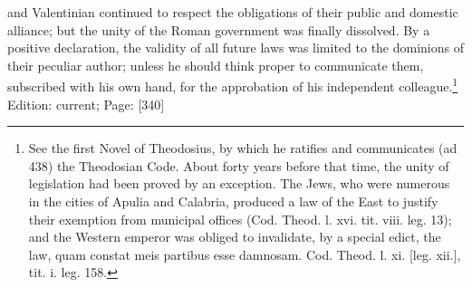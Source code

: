 and Valentinian continued to respect the obligations of their public and domestic alliance; but the unity of the Roman government was finally dissolved. By a positive declaration, the validity of all future laws was limited to the dominions of their peculiar author; unless he should think proper to communicate them, subscribed with his own hand, for the approbation of his independent colleague.\footnote{See the first Novel of Theodosius, by which he ratifies and communicates (ad 438) the Theodosian Code. About forty years before that time, the unity of legislation had been proved by an exception. The Jews, who were numerous in the cities of Apulia and Calabria, produced a law of the East to justify their exemption from municipal offices (Cod. Theod. l. xvi. tit. viii. leg. 13); and the Western emperor was obliged to invalidate, by a special edict, the law, quam constat meis partibus esse damnosam. Cod. Theod. l. xi. [leg. xii.], tit. i. leg. 158.}
Edition: current; Page: [340]

